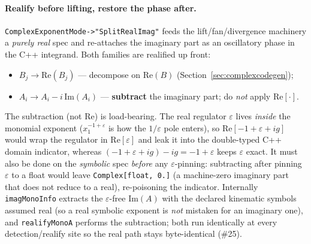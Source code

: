 \documentclass[11pt,a4paper]{article}
\begin{document}
\paragraph{Realify before lifting, restore the phase after.} \texttt{ComplexExponentMode->"SplitRealImag"} feeds the lift/fan/divergence machinery a \emph{purely real} spec and re-attaches the imaginary part as an oscillatory phase in the C++ integrand. Both families are realified up front:
\begin{itemize}\itemsep2pt
  \item $B_j\to\mathrm{Re}(B_j)$ --- decompose on $\mathrm{Re}(B)$ (Section~\ref{sec:complexcodegen});
  \item $A_i\to A_i-i\,\mathrm{Im}(A_i)$ --- \textbf{subtract} the imaginary part; do \emph{not} apply $\mathrm{Re}[\cdot]$.
\end{itemize}
The subtraction (not $\mathrm{Re}$) is load-bearing. The real regulator $\varepsilon$ lives \emph{inside} the monomial exponent ($x_1^{-1+\varepsilon}$ is how the $1/\varepsilon$ pole enters), so $\mathrm{Re}[-1+\varepsilon+ig]$ would wrap the regulator in $\mathrm{Re}[\varepsilon]$ and leak it into the double-typed C++ domain indicator, whereas $(-1+\varepsilon+ig)-ig=-1+\varepsilon$ keeps $\varepsilon$ exact. It must also be done on the \emph{symbolic} spec \emph{before} any $\varepsilon$-pinning: subtracting after pinning $\varepsilon$ to a float would leave \texttt{Complex[float, 0.]} (a machine-zero imaginary part that does not reduce to a real), re-poisoning the indicator. Internally \texttt{imagMonoInfo} extracts the $\varepsilon$-free $\mathrm{Im}(A)$ with the declared kinematic symbols assumed real (so a real symbolic exponent is \emph{not} mistaken for an imaginary one), and \texttt{realifyMonoA} performs the subtraction; both run identically at every detection/realify site so the real path stays byte-identical (\#25).
\end{document}
